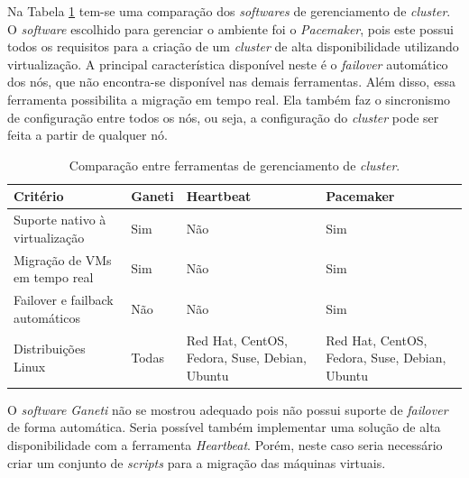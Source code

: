 Na Tabela \ref{tab:clusterger} tem-se uma comparação dos \textit{softwares} de gerenciamento de \textit{cluster}. 
O \textit{software} escolhido para gerenciar o ambiente foi o \textit{Pacemaker}, pois este possui todos os requisitos para a criação de um 
\textit{cluster} de alta disponibilidade utilizando virtualização. A principal característica disponível neste é o \textit{failover} automático
dos nós, que não encontra-se disponível nas demais ferramentas. Além disso, essa ferramenta possibilita a migração em tempo real. 
Ela também faz o sincronismo de configuração entre todos os nós, ou seja, a configuração do \textit{cluster} pode ser feita a partir de qualquer nó. 

\begin{table}[h!]
\caption{Comparação entre ferramentas de gerenciamento de \textit{cluster}.}
\label{tab:clusterger}
\begin{center}
\begin{tabular}{|l|p{2cm}|p{3.5cm}|p{3.5cm}|}\hline
\textbf{Critério} & \textbf{Ganeti} & \textbf{Heartbeat} & \textbf{Pacemaker} \\\hline
Suporte nativo à virtualização & Sim & Não & Sim \\\hline
Migração de \acp{VM} em tempo real & Sim & Não & Sim \\\hline
Failover e failback automáticos & Não & Não & Sim \\\hline
Distribuições Linux & Todas & Red Hat, CentOS, Fedora, Suse, Debian, Ubuntu & Red Hat, CentOS, Fedora, Suse, Debian, Ubuntu \\\hline
\end{tabular}
\end{center}
\end{table}

O \textit{software} \textit{Ganeti} não se mostrou adequado pois não possui suporte de \textit{failover} de forma automática. 
Seria possível também implementar uma solução de alta disponibilidade com a ferramenta \textit{Heartbeat}. Porém, neste caso seria necessário 
criar um conjunto de \textit{scripts} para a migração das máquinas virtuais.

